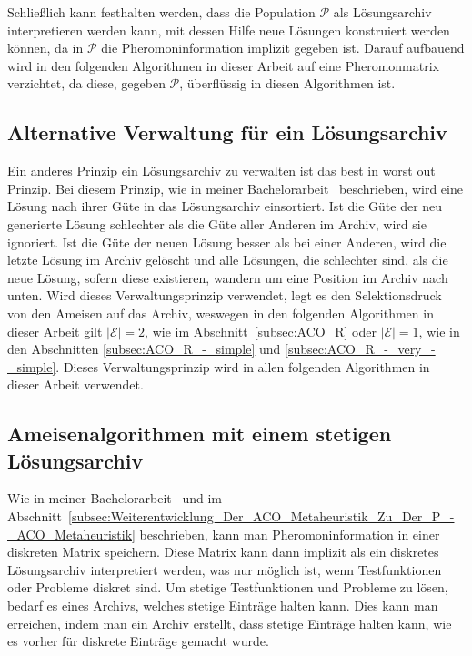 \documentclass[fontsize=12, a4aper]{scrartcl}
\begin{document}
	Schließlich kann festhalten werden, dass die Population \(\mathcal{P}\) als Lösungsarchiv interpretieren werden kann, mit dessen Hilfe neue Lösungen konstruiert werden können, da in \(\mathcal{P}\) die Pheromoninformation implizit gegeben ist. Darauf aufbauend wird in den folgenden Algorithmen in dieser Arbeit auf eine Pheromonmatrix verzichtet, da diese, gegeben \(\mathcal{P}\), überflüssig in diesen Algorithmen ist.
	
	\subsection{Alternative Verwaltung für ein Lösungsarchiv} \label{subsec:Alternative_Verwaltungen_Fuer_Ein_Loesunsarchiv}
	
	Ein anderes Prinzip ein Lösungsarchiv zu verwalten ist das \glqq best in worst out\grqq{} Prinzip. Bei diesem Prinzip, wie in meiner Bachelorarbeit~\cite{FCM_2019} beschrieben, wird eine Lösung nach ihrer Güte in das Lösungsarchiv einsortiert. Ist die Güte der neu generierte Lösung schlechter als die Güte aller Anderen im Archiv, wird sie ignoriert. Ist die Güte der neuen Lösung besser als bei einer Anderen, wird die letzte Lösung im Archiv gelöscht und alle Lösungen, die schlechter sind, als die neue Lösung, sofern diese existieren, wandern um eine Position im Archiv nach unten. Wird dieses Verwaltungsprinzip verwendet, legt es den Selektionsdruck von den Ameisen auf das Archiv, weswegen in den folgenden Algorithmen in dieser Arbeit gilt \(|\mathcal{E}| = 2\), wie im Abschnitt~\ref{subsec:ACO_R} oder \(|\mathcal{E}| = 1\), wie in den Abschnitten \ref{subsec:ACO_R_-_simple} und \ref{subsec:ACO_R_-_very_-_simple}. Dieses Verwaltungsprinzip wird in allen folgenden Algorithmen in dieser Arbeit verwendet. 
	
	\subsection{Ameisenalgorithmen mit einem stetigen Lösungsarchiv} \label{subsec:Ameisenalgorithmen_Mit_Einem_Stetigen_Loesungsarchiv}
	
	Wie in meiner Bachelorarbeit~\cite{FCM_2019} und im Abschnitt~\ref{subsec:Weiterentwicklung_Der_ACO_Metaheuristik_Zu_Der_P_-_ACO_Metaheuristik} beschrieben, kann man Pheromoninformation in einer diskreten Matrix speichern. Diese Matrix kann dann implizit als ein diskretes Lösungsarchiv interpretiert werden, was nur möglich ist, wenn Testfunktionen oder Probleme diskret sind. Um stetige Testfunktionen und Probleme zu lösen, bedarf es eines Archivs, welches stetige Einträge halten kann. Dies kann man erreichen, indem man ein Archiv erstellt, dass stetige Einträge halten kann, wie es vorher für diskrete Einträge gemacht wurde.\hfill\newline
	
\end{document}
